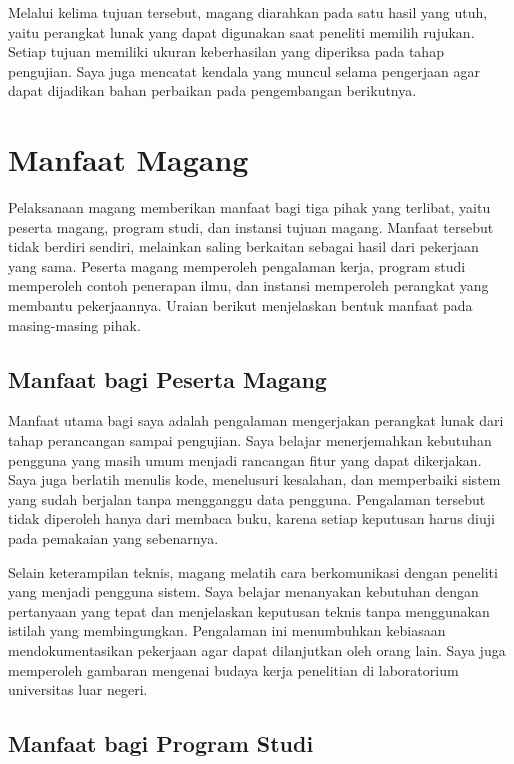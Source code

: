 Melalui kelima tujuan tersebut, magang diarahkan pada satu hasil yang utuh,
yaitu perangkat lunak yang dapat digunakan saat peneliti memilih rujukan. Setiap
tujuan memiliki ukuran keberhasilan yang diperiksa pada tahap pengujian. Saya
juga mencatat kendala yang muncul selama pengerjaan agar dapat dijadikan bahan
perbaikan pada pengembangan berikutnya.

\section{Manfaat Magang}

Pelaksanaan magang memberikan manfaat bagi tiga pihak yang terlibat, yaitu
peserta magang, program studi, dan instansi tujuan magang. Manfaat tersebut
tidak berdiri sendiri, melainkan saling berkaitan sebagai hasil dari pekerjaan
yang sama. Peserta magang memperoleh pengalaman kerja, program studi memperoleh
contoh penerapan ilmu, dan instansi memperoleh perangkat yang membantu
pekerjaannya. Uraian berikut menjelaskan bentuk manfaat pada masing-masing
pihak.

\subsection{Manfaat bagi Peserta Magang}

Manfaat utama bagi saya adalah pengalaman mengerjakan perangkat lunak dari
tahap perancangan sampai pengujian. Saya belajar menerjemahkan kebutuhan
pengguna yang masih umum menjadi rancangan fitur yang dapat dikerjakan. Saya
juga berlatih menulis kode, menelusuri kesalahan, dan memperbaiki sistem yang
sudah berjalan tanpa mengganggu data pengguna. Pengalaman tersebut tidak
diperoleh hanya dari membaca buku, karena setiap keputusan harus diuji pada
pemakaian yang sebenarnya.

Selain keterampilan teknis, magang melatih cara berkomunikasi dengan peneliti
yang menjadi pengguna sistem. Saya belajar menanyakan kebutuhan dengan
pertanyaan yang tepat dan menjelaskan keputusan teknis tanpa menggunakan istilah
yang membingungkan. Pengalaman ini menumbuhkan kebiasaan mendokumentasikan
pekerjaan agar dapat dilanjutkan oleh orang lain. Saya juga memperoleh
gambaran mengenai budaya kerja penelitian di laboratorium universitas luar
negeri.

\subsection{Manfaat bagi Program Studi}

